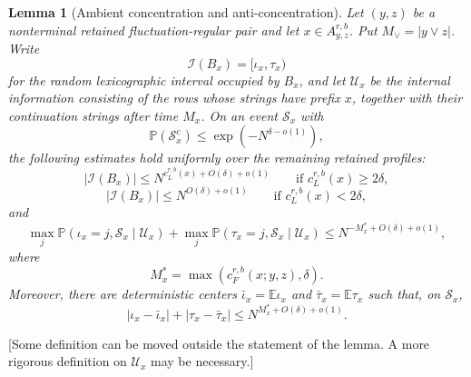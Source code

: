 \documentclass[11pt]{article}
\newtheorem{lem}{Lemma}
\newcommand{\cI}{\mathcal I}
\newcommand{\E}{\mathbb E}
\newcommand{\Pbb}{\mathbb P}
\newcommand{\jscomment}[1]{\textup{\textsf{\color{blue}[#1]}}}
\begin{document}
\begin{lem}[Ambient concentration and anti-concentration]
Let \((y,z)\) be a nonterminal retained fluctuation-regular pair and let
\(x\in A_{y,z}^{r,b}\). Put \(M_\vee=|y\vee z|\). Write
\[
    \cI(B_x)=[\iota_x,\tau_x)
\]
for the random lexicographic interval occupied by \(B_x\), and let
\(\mathcal U_x\) be the internal information consisting of the rows whose
strings have prefix \(x\), together with their continuation strings after
time \(M_x\). On an event \(\mathcal S_x\) with
\[
    \Pbb(\mathcal S_x^c)\le \exp(-N^{\delta-o(1)}),
\]
the following estimates hold uniformly over the remaining retained
profiles:
\[
    |\cI(B_x)|\le N^{c_L^{r,b}(x)+O(\delta)+o(1)}
    \qquad\text{if }c_L^{r,b}(x)\ge 2\delta,
\]
\[
    |\cI(B_x)|\le N^{O(\delta)+o(1)}
    \qquad\text{if }c_L^{r,b}(x)<2\delta,
\]
and
\[
    \max_j \Pbb(\iota_x=j,\mathcal S_x\mid\mathcal U_x)
    +
    \max_j \Pbb(\tau_x=j,\mathcal S_x\mid\mathcal U_x)
    \le
    N^{-M_x^*+O(\delta)+o(1)},
\]
where
\[
    M_x^*=\max(c_F^{r,b}(x;y,z),\delta).
\]
Moreover, there are deterministic centers
\(\bar\iota_x=\E\iota_x\) and \(\bar\tau_x=\E\tau_x\) such that, on
\(\mathcal S_x\),
\[
    |\iota_x-\bar\iota_x|+|\tau_x-\bar\tau_x|
    \le
    N^{M_x^*+O(\delta)+o(1)} .
\]
\end{lem}

\jscomment{Some definition can be moved outside the statement of the lemma. A more rigorous definition on $\mathcal U_x$ may be necessary.}
\end{document}
